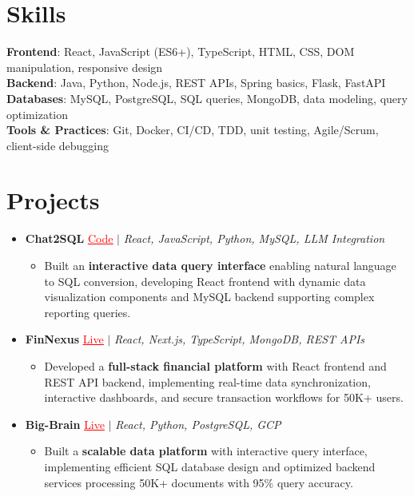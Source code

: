 \documentclass[letterpaper,10pt]{article}
\newcommand{\resumeItem}[1]{\item\small{{#1 \vspace{-2pt}}}}
\newcommand{\resumeProjectHeading}[1]{\item \small #1 \vspace{-2pt}}
\newcommand{\resumeSubHeadingListStart}{\begin{itemize}[leftmargin=0.0in, label={}]}
\newcommand{\resumeSubHeadingListEnd}{\end{itemize}}
\newcommand{\resumeProjItemListStart}{\begin{itemize}[leftmargin=0.15in,label=\textbullet,itemsep=0pt,topsep=0pt,parsep=0pt,partopsep=0pt]}
\newcommand{\resumeProjItemListEnd}{\end{itemize}\vspace{-4pt}}
\begin{document}
\section{Skills}
\begin{itemize}[leftmargin=0.15in, label={}]
\small{\item{
\textbf{Frontend}: React, JavaScript (ES6+), TypeScript, HTML, CSS, DOM manipulation, responsive design \\
\textbf{Backend}: Java, Python, Node.js, REST APIs, Spring basics, Flask, FastAPI \\
\textbf{Databases}: MySQL, PostgreSQL, SQL queries, MongoDB, data modeling, query optimization \\
\textbf{Tools \& Practices}: Git, Docker, CI/CD, TDD, unit testing, Agile/Scrum, client-side debugging
}}
\end{itemize}
\vspace{-16pt}
\section{Projects}
\resumeSubHeadingListStart
\vspace{-2pt}
\resumeProjectHeading{\textbf{Chat2SQL} {\href{https://github.com/SAHAJ-BHADJA/Chat2SQL}{\textcolor{red}{\underline{Code}}}} $|$ \emph{React, JavaScript, Python, MySQL, LLM Integration}}
\resumeProjItemListStart
\resumeItem{Built an \textbf{interactive data query interface} enabling natural language to SQL conversion, developing React frontend with dynamic data visualization components and MySQL backend supporting complex reporting queries.}
\resumeProjItemListEnd
\vspace{3pt}
\resumeProjectHeading{\textbf{FinNexus} {\href{https://fin-nexus.vercel.app/}{\textcolor{red}{\underline{Live}}}} $|$ \emph{React, Next.js, TypeScript, MongoDB, REST APIs}}
\resumeProjItemListStart
\resumeItem{Developed a \textbf{full-stack financial platform} with React frontend and REST API backend, implementing real-time data synchronization, interactive dashboards, and secure transaction workflows for 50K+ users.}
\resumeProjItemListEnd
\vspace{3pt}
\resumeProjectHeading{\textbf{Big-Brain} {\href{https://big-brain-pied.vercel.app/}{\textcolor{red}{\underline{Live}}}} $|$ \emph{React, Python, PostgreSQL, GCP}}
\resumeProjItemListStart
\resumeItem{Built a \textbf{scalable data platform} with interactive query interface, implementing efficient SQL database design and optimized backend services processing 50K+ documents with 95\% query accuracy.}
\resumeProjItemListEnd
\resumeSubHeadingListEnd
\end{document}
